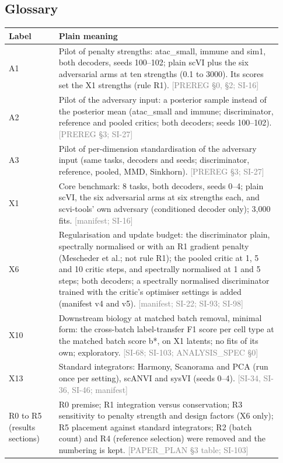 \documentclass[11pt]{article}
\newcommand{\src}[1]{{\scriptsize\textcolor{gray}{[#1]}}}
\begin{document}
\subsection*{Glossary}
{\small
\begin{longtable}{>{\raggedright\arraybackslash}p{0.17\linewidth}>{\raggedright\arraybackslash}p{0.76\linewidth}}
\toprule
Label & Plain meaning \\
\midrule
\endhead
A1 & Pilot of penalty strengths: atac\_small, immune and sim1, both decoders, seeds 100--102; plain scVI plus the six adversarial arms at ten strengths (0.1 to 3000). Its scores set the X1 strengths (rule R1). \src{PREREG \S0, \S2; SI-16} \\
A2 & Pilot of the adversary input: a posterior sample instead of the posterior mean (atac\_small and immune; discriminator, reference and pooled critics; both decoders; seeds 100--102). \src{PREREG \S3; SI-27} \\
A3 & Pilot of per-dimension standardisation of the adversary input (same tasks, decoders and seeds; discriminator, reference, pooled, MMD, Sinkhorn). \src{PREREG \S3; SI-27} \\
X1 & Core benchmark: 8 tasks, both decoders, seeds 0--4; plain scVI, the six adversarial arms at six strengths each, and scvi-tools' own adversary (conditioned decoder only); 3,000 fits. \src{manifest; SI-16} \\
X6 & Regularisation and update budget: the discriminator plain, spectrally normalised or with an R1 gradient penalty (Mescheder et al.; not rule R1); the pooled critic at 1, 5 and 10 critic steps, and spectrally normalised at 1 and 5 steps; both decoders; a spectrally normalised discriminator trained with the critic's optimiser settings is added (manifest v4 and v5). \src{manifest; SI-22; SI-93; SI-98} \\
X10 & Downstream biology at matched batch removal, minimal form: the cross-batch label-transfer F1 score per cell type at the matched batch score b*, on X1 latents; no fits of its own; exploratory. \src{SI-68; SI-103; ANALYSIS\_SPEC \S0} \\
X13 & Standard integrators: Harmony, Scanorama and PCA (run once per setting), scANVI and sysVI (seeds 0--4). \src{SI-34, SI-36, SI-46; manifest} \\
R0 to R5 (results sections) & R0 premise; R1 integration versus conservation; R3 sensitivity to penalty strength and design factors (X6 only); R5 placement against standard integrators; R2 (batch count) and R4 (reference selection) were removed and the numbering is kept. \src{PAPER\_PLAN \S3 table; SI-103} \\

\end{longtable}}
\end{document}
